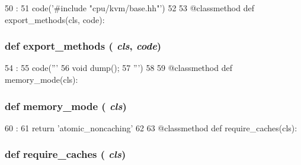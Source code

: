 \begin{DoxyCode}
50                                              :
51         code('#include "cpu/kvm/base.hh"')
52 
53     @classmethod
    def export_methods(cls, code):
\end{DoxyCode}
\hypertarget{classBaseKvmCPU_1_1BaseKvmCPU_ab373c5eaef9a7b80491a097389260f4a}{
\subsubsection[{export\_\-methods}]{\setlength{\rightskip}{0pt plus 5cm}def export\_\-methods ( {\em cls}, \/   {\em code})}}
\label{classBaseKvmCPU_1_1BaseKvmCPU_ab373c5eaef9a7b80491a097389260f4a}



\begin{DoxyCode}
54                                  :
55         code('''
56       void dump();
57 ''')
58 
59     @classmethod
    def memory_mode(cls):
\end{DoxyCode}
\hypertarget{classBaseKvmCPU_1_1BaseKvmCPU_a53d73a2f804df6a1dcabb22052d09773}{
\subsubsection[{memory\_\-mode}]{\setlength{\rightskip}{0pt plus 5cm}def memory\_\-mode ( {\em cls})}}
\label{classBaseKvmCPU_1_1BaseKvmCPU_a53d73a2f804df6a1dcabb22052d09773}



\begin{DoxyCode}
60                         :
61         return 'atomic_noncaching'
62 
63     @classmethod
    def require_caches(cls):
\end{DoxyCode}
\hypertarget{classBaseKvmCPU_1_1BaseKvmCPU_afcb2c5440cbf782e304bdb958eadf744}{
\subsubsection[{require\_\-caches}]{\setlength{\rightskip}{0pt plus 5cm}def require\_\-caches ( {\em cls})}}
\label{classBaseKvmCPU_1_1BaseKvmCPU_afcb2c5440cbf782e304bdb958eadf744}



